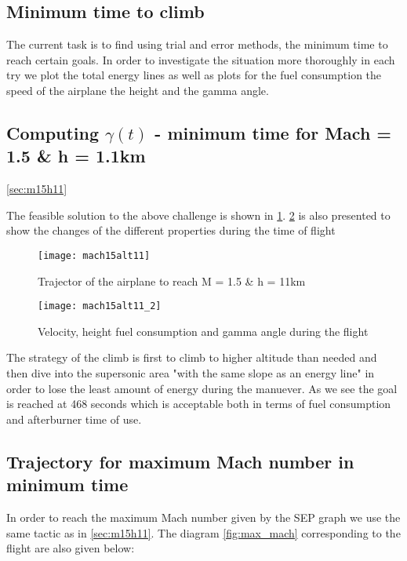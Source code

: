 \subsection{Minimum time to climb}

\noindent The current task is to find using trial and error methods, the minimum time 
to reach certain goals. In order to investigate the situation more thoroughly 
in each try we plot the total energy lines as well as plots for the fuel consumption
the speed of the airplane the height and the gamma angle.

\subsection{Computing $\gamma(t)$  - minimum time for Mach = 1.5 \& h = 1.1km}
\ref{sec:m15h11}

The feasible solution to the above challenge is shown in \ref{fig:m15h11}. \ref{fig:m15h11_2}
is also presented to show the changes of the different properties during the time of flight

\begin{figure}[H]
    \centering
    \hspace*{-2cm}
    \texttt{[image: mach15alt11]}
    \caption{Trajector of the airplane to reach M = 1.5 \& h = 11km}
    \label{fig:m15h11}
\end{figure}

\begin{figure}[H]
    \centering
    \hspace*{-2cm}
    \texttt{[image: mach15alt11\_2]}
    \caption{Velocity, height fuel consumption and gamma angle during the flight}
    \label{fig:m15h11_2}
\end{figure}

The strategy of the climb is first to climb to higher altitude than needed and then
dive into the supersonic area "with the same slope as an energy line" in order to
lose the least amount of energy during the manuever.
As we see the goal is reached at 468 seconds which is  acceptable both in terms of 
fuel consumption and afterburner time of use.


\subsection{Trajectory for maximum Mach number in minimum time}
In order to reach the maximum Mach number given by the SEP graph we use the same
tactic as in \ref{sec:m15h11}. The diagram \ref{fig:max_mach} corresponding to the flight are also given below:

